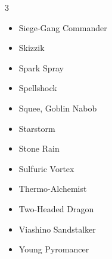 \documentclass[11pt]{article}
\begin{document}
\begin{multicols}{3}
\begin{itemize}[leftmargin=1em,itemsep=0pt,parsep=0pt]
\item Siege-Gang Commander
\item Skizzik
\item Spark Spray
\item Spellshock
\item Squee, Goblin Nabob
\item Starstorm
\item Stone Rain
\item Sulfuric Vortex
\item Thermo-Alchemist
\item Two-Headed Dragon
\item Viashino Sandstalker
\item Young Pyromancer
\end{itemize}
\end{multicols}
\end{document}
